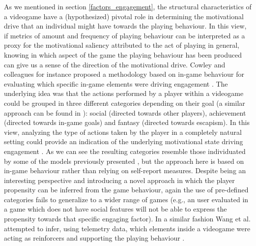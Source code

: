 As we mentioned in section \ref{factors_engagement}, the structural characteristics of a videogame have a (hypothesized) pivotal role in determining the motivational drive that an individual might have towards the playing behaviour. In this view, if metrics of amount and frequency of playing behaviour can be interpreted as a proxy for the motivational saliency attributed to the act of playing in general, knowing in which aspect of the game the playing behaviour has been produced can give us a sense of the direction of the motivational drive. Cowley and colleagues for instance proposed a methodology based on in-game behaviour for evaluating which specific in-game elements were driving engagement \cite{cowley2016behavlets}. The underlying idea was that the actions performed by a player within a videogame could be grouped in three different categories depending on their goal (a similar approach can be found in \cite{bartle1996hearts}): social (directed towards other players), achievement (directed towards in-game goals) and fantasy (directed towards escapism). In this view, analyzing the type of actions taken by the player in a completely natural setting could provide an indication of the underlying motivational state driving engagement \cite{cowley2016behavlets}. As we can see the resulting categories resemble those individuated by some of the models previously presented \cite{yee2006motivations, bartle1996hearts}, but the approach here is based on in-game behaviour rather than relying on self-report measures. Despite being an interesting perspective and introducing a novel approach in which the player propensity can be inferred from the game behaviour, again the use of pre-defined categories fails to generalize to a wider range of games (e.g., an user evaluated in a game which does not have social features will not be able to express the propensity towards that specific engaging factor). In a similar fashion Wang et al. attempted to infer, using telemetry data, which elements inside a videogame were acting as reinforcers and supporting the playing behaviour \cite{wang2018beyond}. 

